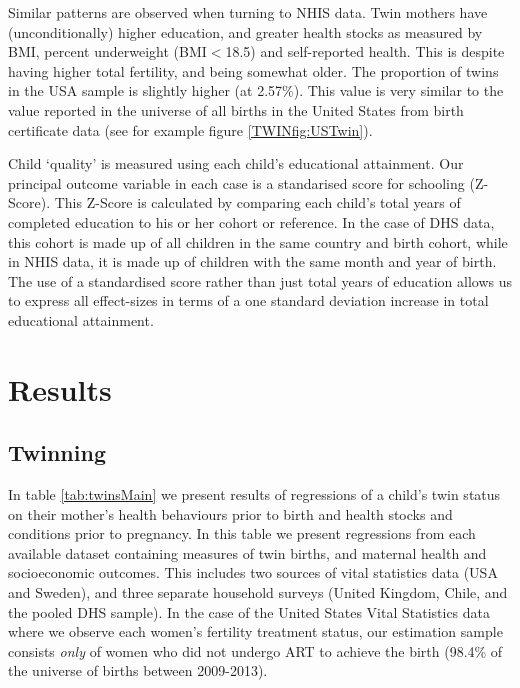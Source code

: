 \documentclass[subeqn]{article}
\begin{document}
\begin{spacing}{1.4}
Similar patterns are observed when turning to NHIS data.  Twin mothers have
(unconditionally) higher education, and greater health stocks as measured by
BMI, percent underweight (BMI$<$18.5) and self-reported health.  This is 
despite having higher total fertility, and being somewhat older.  The 
proportion of twins in the USA sample is slightly higher (at 2.57\%). This
value is very similar to the value reported in the universe of all births in
the United States from birth certificate data (see for example figure 
\ref{TWINfig:USTwin}).

Child `quality' is measured using each child's educational attainment. Our 
principal outcome variable in each case is a standarised score for schooling 
(Z-Score). This Z-Score is calculated by comparing each child's total years of 
completed education to his or her cohort or reference.  In the case of DHS data,
this cohort is made up of all children in the same country and birth cohort, 
while in NHIS data, it is made up of children with the same month and year of 
birth. The use of a standardised score rather than just total years of education
allows us to express all effect-sizes in terms of a one standard deviation 
increase in total educational attainment.

\section{Results}                                  \label{TWINscn:results}
\subsection{Twinning}                              \label{TWINsscn:twinning}
In table \ref{tab:twinsMain} we present results of regressions of a child's
twin status on their mother's health behaviours prior to birth and health
stocks and conditions prior to pregnancy.  In this table we present regressions
from each available dataset containing measures of twin births, and maternal
health and socioeconomic outcomes.  This includes two sources of vital
statistics data (USA and Sweden), and three separate household surveys (United
Kingdom, Chile, and the pooled DHS sample).  In the case of the United States
Vital Statistics data where we observe each women's fertility treatment status,
our estimation sample consists \emph{only} of women who did not undergo ART to
achieve the birth (98.4\% of the universe of births between 2009-2013).


\end{spacing}
\end{document}
